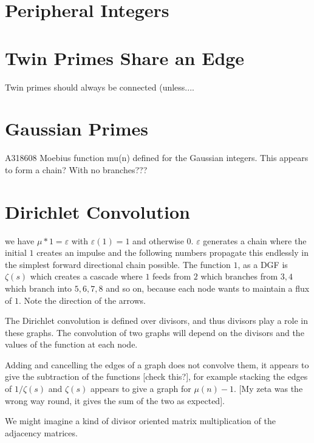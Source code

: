 \documentclass{article}
\begin{document}
\section{Peripheral Integers}

\section{Twin Primes Share an Edge}
Twin primes should always be connected (unless.... 

\section{Gaussian Primes}
A318608		Moebius function mu(n) defined for the Gaussian integers.
This appears to form a chain? With no branches???


\section{Dirichlet Convolution}
we have $\mu * 1 = \varepsilon$ with $\varepsilon(1)=1$ and otherwise 0. $\varepsilon$ generates a chain where the initial $1$ creates an impulse and the following numbers propagate this endlessly in the simplest forward directional chain possible. The function $1$, as a DGF is $\zeta(s)$ which creates a cascade where $1$ feeds from $2$ which branches from $3,4$ which branch into $5,6,7,8$ and so on, because each node wants to maintain a flux of $1$. Note the direction of the arrows.

The Dirichlet convolution is defined over divisors, and thus divisors play a role in these graphs. The convolution of two graphs will depend on the divisors and the values of the function at each node.

Adding and cancelling the edges of a graph does not convolve them, it appears to give the subtraction of the functions [check this?], for example stacking the edges of $1/\zeta(s)$ and $\zeta(s)$ appears to give a graph for $\mu(n)-1$. [My zeta was the wrong way round, it gives the sum of the two as expected].

We might imagine a kind of divisor oriented matrix multiplication of the adjacency matrices. 
\end{document}
